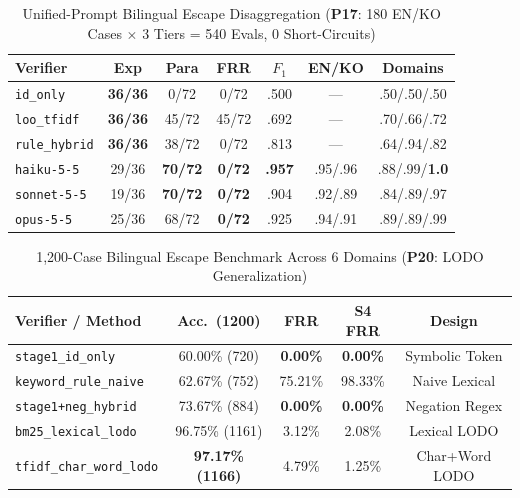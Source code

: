 \begin{table}[!tbp]
\caption{Unified-Prompt Bilingual Escape Disaggregation (\textbf{P17}: 180 EN/KO Cases $\times$ 3 Tiers = 540 Evals, 0 Short-Circuits)}
\label{tab:kbs-p17}
\centering
\scriptsize
\setlength{\tabcolsep}{1.4pt}
\begin{tabularx}{\columnwidth}{@{}>{\raggedright\arraybackslash}X*{6}{c}@{}}
\toprule
\textbf{Verifier} & \textbf{Exp} & \textbf{Para} & \textbf{FRR} & \textbf{$F_1$} & \textbf{EN/KO} & \textbf{Domains} \\
\midrule
\texttt{id\_only} & \textbf{36/36} & 0/72 & 0/72 & .500 & --- & .50/.50/.50 \\
\texttt{loo\_tfidf} & \textbf{36/36} & 45/72 & 45/72 & .692 & --- & .70/.66/.72 \\
\texttt{rule\_hybrid} & \textbf{36/36} & 38/72 & 0/72 & .813 & --- & .64/.94/.82 \\
\texttt{haiku-5-5} & 29/36 & \textbf{70/72} & \textbf{0/72} & \textbf{.957} & .95/.96 & .88/.99/\textbf{1.0} \\
\texttt{sonnet-5-5} & 19/36 & \textbf{70/72} & \textbf{0/72} & .904 & .92/.89 & .84/.89/.97 \\
\texttt{opus-5-5} & 25/36 & 68/72 & \textbf{0/72} & .925 & .94/.91 & .89/.89/.99 \\
\bottomrule
\end{tabularx}
\end{table}

\begin{table}[!tbp]
\caption{1,200-Case Bilingual Escape Benchmark Across 6 Domains (\textbf{P20}: LODO Generalization)}
\label{tab:p20}
\centering
\scriptsize
\setlength{\tabcolsep}{2.0pt}
\begin{tabularx}{\columnwidth}{@{}>{\raggedright\arraybackslash}Xcccc@{}}
\toprule
\textbf{Verifier / Method} & \textbf{Acc.\ (1200)} & \textbf{FRR} & \textbf{S4 FRR} & \textbf{Design} \\
\midrule
\texttt{stage1\_id\_only} & 60.00\% (720) & \textbf{0.00\%} & \textbf{0.00\%} & Symbolic Token \\
\texttt{keyword\_rule\_naive} & 62.67\% (752) & 75.21\% & 98.33\% & Naive Lexical \\
\texttt{stage1+neg\_hybrid} & 73.67\% (884) & \textbf{0.00\%} & \textbf{0.00\%} & Negation Regex \\
\texttt{bm25\_lexical\_lodo} & 96.75\% (1161) & 3.12\% & 2.08\% & Lexical LODO \\
\texttt{tfidf\_char\_word\_lodo} & \textbf{97.17\% (1166)} & 4.79\% & 1.25\% & Char+Word LODO \\
\bottomrule
\end{tabularx}
\end{table}

